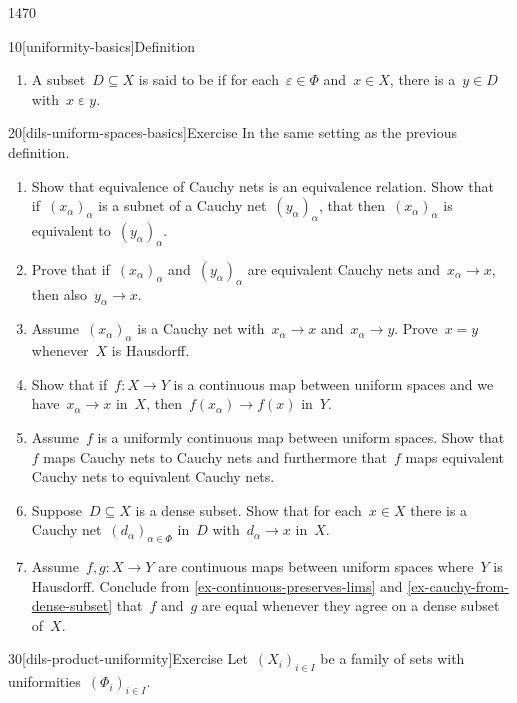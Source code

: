 \begin{parsec}{1470}
\begin{point}{10}[uniformity-basics]{Definition}
\begin{enumerate}
\item
    A subset~$D \subseteq X$ is said to be 
    if for each~$\varepsilon \in \Phi$ and~$x \in X$,
    there is a~$y \in D$
    with~$x \mathrel\varepsilon y$.
\end{enumerate}
\end{point}
\begin{point}{20}[dils-uniform-spaces-basics]{Exercise}%
    In the same setting as the previous definition.
    \begin{enumerate}
\item
    Show that equivalence of Cauchy nets is an equivalence relation.
    Show that if~$(x_\alpha)_\alpha$ is a subnet of
    a Cauchy net~$(y_\alpha)_\alpha$,
        that then~$(x_\alpha)_\alpha$ is equivalent to~$(y_\alpha)_\alpha$.
\item
    Prove that if~$(x_\alpha)_\alpha$ and~$(y_\alpha)_\alpha$
        are equivalent Cauchy nets and~$x_\alpha \to x$,
        then also~$y_\alpha \to x$.
\item
    Assume~$(x_\alpha)_\alpha$ is a Cauchy net with~$x_\alpha \to x$
        and~$x_\alpha \to y$.  Prove~$x = y$ whenever~$X$ is Hausdorff.
\item\label{ex-continuous-preserves-lims}
    Show that if~$f\colon X \to Y$ is a continuous map
    between uniform spaces
        and we have~$x_\alpha \to x$ in~$X$,
        then~$f(x_\alpha) \to f(x)$ in~$Y$.
\item
    Assume~$f$ is a uniformly continuous map between uniform spaces.
    Show that $f$ maps Cauchy nets to Cauchy nets
    and furthermore that~$f$ maps equivalent Cauchy nets to equivalent
        Cauchy nets.
\item\label{ex-cauchy-from-dense-subset}
    Suppose~$D \subseteq X$ is a dense subset.
    Show that for each~$x \in X$
    there is a Cauchy net~$(d_\alpha)_{\alpha \in \Phi}$
    in~$D$ with~$d_\alpha \to x$ in~$X$.
\item
    Assume~$f,g\colon X \to Y$ are continuous maps between uniform spaces
        where~$Y$ is Hausdorff.
Conclude from \ref{ex-continuous-preserves-lims} and
    \ref{ex-cauchy-from-dense-subset}
    that~$f$ and~$g$ are equal whenever they agree on a dense subset of~$X$.
    \end{enumerate}
\end{point}
\begin{point}{30}[dils-product-uniformity]{Exercise}%
    Let~$(X_i)_{i \in I}$ be a family of sets with
        uniformities~$(\Phi_i)_{i \in I}$.

\end{point}
\end{parsec}
